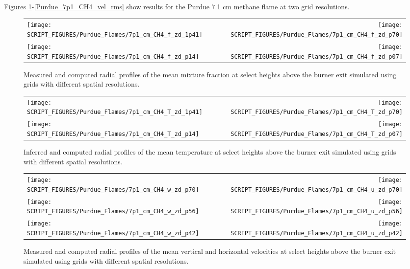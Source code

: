 Figures \ref{Purdue_7p1_CH4_mixture_fraction}-\ref{Purdue_7p1_CH4_vel_rms} show results for the Purdue 7.1 cm methane flame \cite{Xin:CF2005} at two grid resolutions.

\begin{figure}[!h]
\begin{tabular*}{\textwidth}{l@{\extracolsep{\fill}}r}
\texttt{[image: SCRIPT\_FIGURES/Purdue\_Flames/7p1\_cm\_CH4\_f\_zd\_1p41]} &
\texttt{[image: SCRIPT\_FIGURES/Purdue\_Flames/7p1\_cm\_CH4\_f\_zd\_p70]} \\
\texttt{[image: SCRIPT\_FIGURES/Purdue\_Flames/7p1\_cm\_CH4\_f\_zd\_p14]} &
\texttt{[image: SCRIPT\_FIGURES/Purdue\_Flames/7p1\_cm\_CH4\_f\_zd\_p07]}
\end{tabular*}
\caption[Purdue 7.1 cm methane flame mean mixture fraction profiles]
{Measured \cite{Zhou:CS1998} and computed radial profiles of the mean mixture fraction at select heights above the burner exit simulated using grids with different spatial resolutions.}
\label{Purdue_7p1_CH4_mixture_fraction}
\end{figure}

\newpage

\begin{figure}[p]
\begin{tabular*}{\textwidth}{l@{\extracolsep{\fill}}r}
\texttt{[image: SCRIPT\_FIGURES/Purdue\_Flames/7p1\_cm\_CH4\_T\_zd\_1p41]} &
\texttt{[image: SCRIPT\_FIGURES/Purdue\_Flames/7p1\_cm\_CH4\_T\_zd\_p70]} \\
\texttt{[image: SCRIPT\_FIGURES/Purdue\_Flames/7p1\_cm\_CH4\_T\_zd\_p14]} &
\texttt{[image: SCRIPT\_FIGURES/Purdue\_Flames/7p1\_cm\_CH4\_T\_zd\_p07]}
\end{tabular*}
\caption[Purdue 7.1 cm methane flame mean temperature profiles]
{Inferred \cite{Xin:CF2005} and computed radial profiles of the mean temperature at select heights above the burner exit simulated using grids with different spatial resolutions.}
\label{Purdue_7p1_CH4_temperature}
\end{figure}

\begin{figure}[p]
\begin{tabular*}{\textwidth}{l@{\extracolsep{\fill}}r}
\texttt{[image: SCRIPT\_FIGURES/Purdue\_Flames/7p1\_cm\_CH4\_w\_zd\_p70]} &
\texttt{[image: SCRIPT\_FIGURES/Purdue\_Flames/7p1\_cm\_CH4\_u\_zd\_p70]} \\
\texttt{[image: SCRIPT\_FIGURES/Purdue\_Flames/7p1\_cm\_CH4\_w\_zd\_p56]} &
\texttt{[image: SCRIPT\_FIGURES/Purdue\_Flames/7p1\_cm\_CH4\_u\_zd\_p56]} \\
\texttt{[image: SCRIPT\_FIGURES/Purdue\_Flames/7p1\_cm\_CH4\_w\_zd\_p42]} &
\texttt{[image: SCRIPT\_FIGURES/Purdue\_Flames/7p1\_cm\_CH4\_u\_zd\_p42]}
\end{tabular*}
\caption[Purdue 7.1 cm methane flame mean velocity profiles]
{Measured \cite{Zhou:CS1998} and computed radial profiles of the mean vertical and horizontal velocities at select heights above the burner exit simulated using grids with different spatial resolutions.}
\label{Purdue_7p1_CH4_vertical_velocity}
\end{figure}

